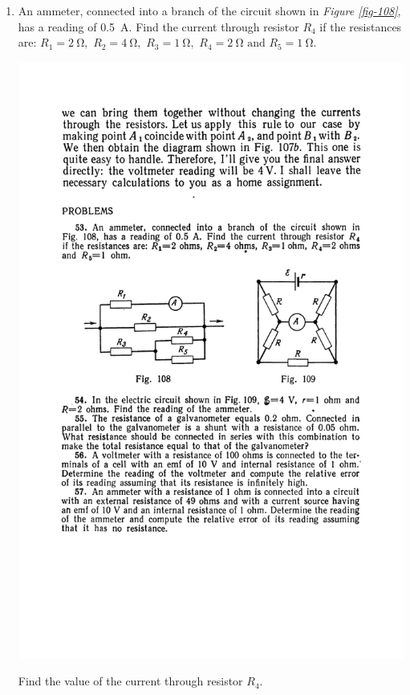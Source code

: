 \documentclass[a4paper,sfsidenotes]{tufte-book}
\begin{document}
\begin{enumerate}[resume=problems]
\item An ammeter, connected into a branch of the circuit shown in \emph{Figure \ref{fig-108}}, has a reading of \SI{0.5}{\ampere}. Find the current through resistor $R_{4}$ if the resistances are: $R_{1} = \SI{2}{\ohm}, \,\,R_{2}= \SI{4}{\ohm}, \,\,R_{3}= \SI{1}{\ohm}, \,\,R_{4}= \SI{2}{\ohm}\,\, \text{and} \,\, R_{5}= \SI{1}{\ohm}$.
\begin{marginfigure}[-2cm]%
\centering
\includegraphics[width=\linewidth]{fig-108a}
\caption{Find the value of the current through resistor $R_{4}$.}
\label{fig-108}
\end{marginfigure}


\end{enumerate}
\end{document}
